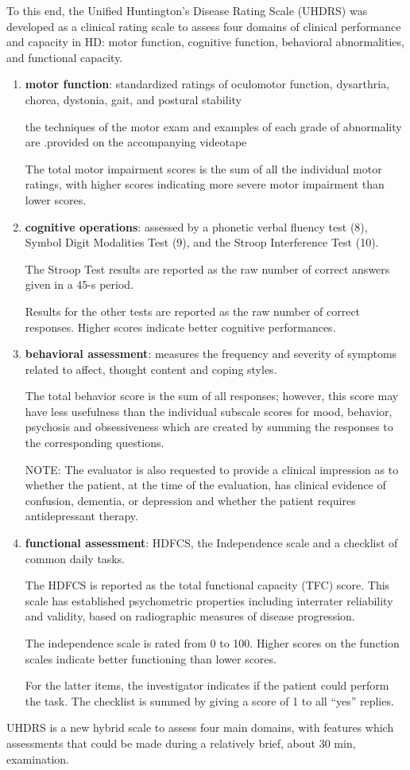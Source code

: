 To this end, the Unified Huntington's Disease Rating Scale (UHDRS) was developed
as a clinical rating scale to assess four domains of clinical performance and
capacity in HD: motor function, cognitive function, behavioral abnormalities,
and functional capacity.
\begin{enumerate}
  \item {\bf motor function}:
   standardized ratings of oculomotor
function, dysarthria, chorea, dystonia, gait,
and postural stability

the techniques
of the motor exam and examples of each
grade of abnormality are .provided on the accompanying
videotape

The total motor impairment scores is the sum of all the individual motor
ratings, with higher scores indicating more severe motor impairment than lower
scores.


  \item {\bf cognitive operations}:
   assessed by a phonetic verbal fluency test (8), Symbol Digit Modalities Test
   (9), and the Stroop Interference Test (10).

The Stroop Test results are reported as the raw number of correct answers given
in a 45-s period.
  
Results for the other tests are reported as the raw number of correct responses.
Higher scores indicate better cognitive performances.

  \item {\bf behavioral assessment}:
  measures the frequency
and severity of symptoms related to affect, thought content and coping styles.

 The total behavior
score is the sum of all responses; however, this
score may have less usefulness than the individual
subscale scores for mood, behavior, psychosis and
obsessiveness which are created by summing the
responses to the corresponding questions.

NOTE: The evaluator
is also requested to provide a clinical impression
as to whether the patient, at the time of the
evaluation, has clinical evidence of confusion, dementia,
or depression and whether the patient requires
antidepressant therapy.

  \item {\bf functional assessment}:
   HDFCS, the Independence scale and a checklist of common daily tasks.

 The HDFCS is reported as the total
functional capacity (TFC) score. This scale has established psychometric
properties including interrater reliability and validity, based on radiographic
measures of disease progression.

The independence scale is rated from 0 to 100. Higher scores on the function
scales indicate better functioning than lower scores.

For the latter items, the investigator indicates if the patient could perform
the task. The checklist is summed by giving a score of 1 to all “yes” replies.


\end{enumerate}
UHDRS is a new hybrid scale to assess four main domains, with features which
assessments that could be made during a relatively brief, about 30 min,
examination.

